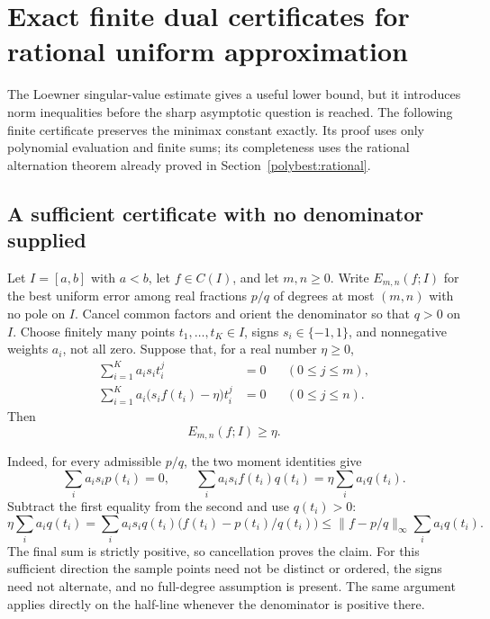 \documentclass[11pt]{article}
\theoremstyle{remark}
\numberwithin{equation}{section}
\begin{document}
\section{Exact finite dual certificates for rational uniform approximation}
\label{polythird:dual}
The Loewner singular-value estimate gives a useful lower bound, but it
introduces norm inequalities before the sharp asymptotic question is
reached.  The following finite certificate preserves the minimax
constant exactly.  Its proof uses only polynomial evaluation and finite
sums; its completeness uses the rational alternation theorem already
proved in Section~\ref{polybest:rational}.

\subsection{A sufficient certificate with no denominator supplied}
Let $I=[a,b]$ with $a<b$, let $f\in C(I)$, and let $m,n\ge0$.
Write $E_{m,n}(f;I)$ for the best uniform error among real fractions
$p/q$ of degrees at most $(m,n)$ with no pole on $I$.  Cancel common
factors and orient the denominator so that $q>0$ on $I$.
Choose finitely many points $t_1,\ldots,t_K\in I$, signs
$s_i\in\{-1,1\}$, and nonnegative weights $a_i$, not all zero.
Suppose that, for a real number $\eta\ge0$,
\begin{align}
 \sum_{i=1}^K a_i s_i t_i^j&=0 &&(0\le j\le m),
       \label{polythird:dual-numerator}\\
 \sum_{i=1}^K a_i\bigl(s_i f(t_i)-\eta\bigr)t_i^j&=0
       &&(0\le j\le n).\label{polythird:dual-denominator}
\end{align}
Then
\begin{equation}\label{polythird:dual-lower}
 E_{m,n}(f;I)\ge\eta.
\end{equation}

Indeed, for every admissible $p/q$, the two moment identities give
\[
 \sum_i a_i s_i p(t_i)=0,\qquad
 \sum_i a_i s_i f(t_i)q(t_i)=\eta\sum_i a_iq(t_i).
\]
Subtract the first equality from the second and use $q(t_i)>0$:
\[
 \eta\sum_i a_iq(t_i)
 =\sum_i a_i s_i q(t_i)\bigl(f(t_i)-p(t_i)/q(t_i)\bigr)
 \le\|f-p/q\|_\infty\sum_i a_iq(t_i).
\]
The final sum is strictly positive, so cancellation proves the claim.
For this sufficient direction the sample points need not be distinct
or ordered, the signs need not alternate, and no full-degree
assumption is present.  The same argument applies directly on the
half-line whenever the denominator is positive there.
\end{document}
